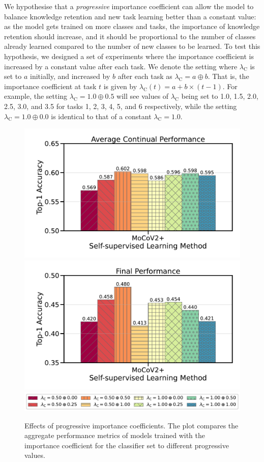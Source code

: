 We hypothesise that a \emph{progressive} importance coefficient can allow the model to balance knowledge retention and new task learning better than a constant value: as the model gets trained on more classes and tasks, the importance of knowledge retention should increase, and it should be proportional to the number of classes already learned compared to the number of new classes to be learned. To test this hypothesis, we designed a set of experiments where the importance coefficient is increased by a constant value after each task. We denote the setting where $\lambda_{\mathrm{C}}$ is set to $a$ initially, and increased by $b$ after each task as $\lambda_{\mathrm{C}}=a \oplus b$. That is, the importance coefficient at task $t$ is given by $\lambda_{\mathrm{C}}(t) = a + b \times (t - 1)$.
For example, the setting $\lambda_{\mathrm{C}}=1.0 \oplus 0.5$ will see values of $\lambda_{\mathrm{C}}$ being set to 1.0, 1.5, 2.0, 2.5, 3.0, and 3.5 for tasks 1, 2, 3, 4, 5, and 6 respectively, while the setting $\lambda_{\mathrm{C}}=1.0 \oplus 0.0$ is identical to that of a constant $\lambda_{\mathrm{C}}=1.0$.

\begin{figure}[t]
\begin{center}
   \includegraphics[width=0.49\linewidth]{figures_new/Part_3/F1-WISDM2019-6Tasks-Continual_Accuracy-v2.pdf}
   \includegraphics[width=0.49\linewidth]{figures_new/Part_3/F1-WISDM2019-6Tasks-Final_Accuracy-v2.pdf} \\
   \vspace{-0.05in}
   \includegraphics[width=0.9\linewidth]{figures_new/Part_3/F1-WISDM2019-6Tasks-v2_legend.pdf}
\end{center}
\vspace{-0.15in}
   \caption{Effects of progressive importance coefficients. The plot compares the aggregate performance metrics of models trained with the importance coefficient for the classifier set to different progressive values.}
   \label{fig:kaizen_general_performance_progressive_lamb}
       \vspace{-0.2in}
\end{figure}


